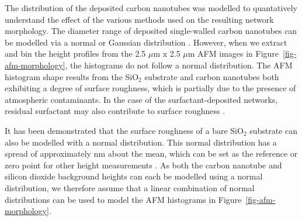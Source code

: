 \documentclass[
  a4paper,
]{scrbook}
\begin{document}
The distribution of the deposited carbon nanotubes was modelled to
quantatively understand the effect of the various methods used on the
resulting network morphology. The diameter range of deposited
single-walled carbon nanotubes can be modelled via a normal or Gaussian
distribution \autocite{Thanihaichelvan2018,Liu2013,Vobornik2023}.
However, when we extract and bin the height profiles from the 2.5
\(\mu\)m x 2.5 \(\mu\)m AFM images in Figure~\ref{fig-afm-morphology},
the histograms do not follow a normal distribution. The AFM histogram
shape results from the SiO\(_2\) substrate and carbon nanotubes both
exhibiting a degree of surface roughness, which is partially due to the
presence of atmospheric contaminants. In the case of the
surfactant-deposited networks, residual surfactant may also contribute
to surface roughness \autocite{Vobornik2023}.

It has been demonstrated that the surface roughness of a bare SiO\(_2\)
substrate can also be modelled with a normal distribution. This normal
distribution has a spread of approximately  nm about the mean, which
can be set as the reference or zero point for other height measurements
\autocite{Velicky2015}. As both the carbon nanotube and silicon dioxide
background heights can each be modelled using a normal distribution, we
therefore assume that a linear combination of normal distributions can
be used to model the AFM histograms in Figure~\ref{fig-afm-morphology}.
\end{document}
